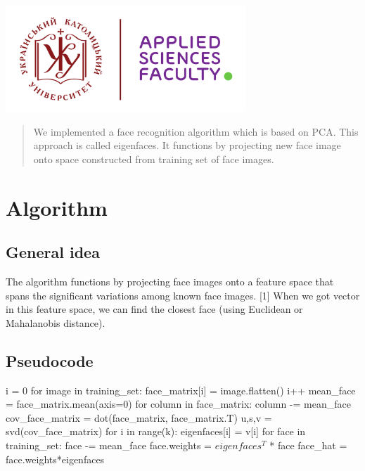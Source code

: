 \documentclass[12pt]{article}
\begin{document}
\begin{titlepage}
\includegraphics[height=4cm]{UCU-Apps.png}\\[1cm] %
 

\vfill %

\end{titlepage}


\begin{abstract}
We implemented a face recognition algorithm which is based on PCA. This approach is called eigenfaces. It functions by projecting new face image onto space constructed from training set of face images. 
\end{abstract}
\section{Algorithm}
\subsection{General idea}
The algorithm functions by projecting face images onto a feature space that spans the significant variations among known face images. [1] When we got vector in this feature space, we can find the closest face (using Euclidean or Mahalanobis distance).
\subsection{Pseudocode}

i = 0
for image in training\_set:
face\_matrix[i] = image.flatten()
i++
mean\_face = face\_matrix.mean(axis=0) 
for column in face\_matrix:
column -= mean\_face
cov\_face\_matrix = dot(face\_matrix,  face\_matrix.T)
u,s,v = svd(cov\_face\_matrix)
for i in range(k):
eigenfaces[i] = v[i]
for face in training\_set:
face -= mean\_face
face.weights =  $eigenfaces^T$ * face
face\_hat =  face.weights*eigenfaces


\clearpage
\end{document}
